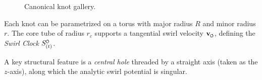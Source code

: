 \documentclass[reprint,aps,onecolumn,nofootinbib]{revtex4-2}
\newcommand{\swirlarrow}{%
    \mathchoice{\mkern-2mu\scriptstyle\boldsymbol{\circlearrowleft}}%
    {\mkern-2mu\scriptstyle\boldsymbol{\circlearrowleft}}%
    {\mkern-2mu\scriptscriptstyle\boldsymbol{\circlearrowleft}}%
    {\mkern-2mu\scriptscriptstyle\boldsymbol{\circlearrowleft}}%
}
\newcommand{\vswirl}{\mathbf{v}_{\swirlarrow}}
\newcommand{\SwirlClock}{S_{(t)}^{\swirlarrow}}
\begin{document}
    \begin{figure}[htbp]
        \centering
        \hfill
        \hfill
        \hfill
        \caption{Canonical knot gallery.}
        \label{fig:knot-gallery}
    \end{figure}

    Each knot can be parametrized on a torus with major radius $R$ and minor radius $r$.
    The core tube of radius $r_c$ supports a tangential swirl velocity $\vswirl$, defining the \emph{Swirl Clock} $\SwirlClock$.

    A key structural feature is a \emph{central hole} threaded by a straight axis (taken as the $z$-axis), along which the analytic swirl potential is singular.
\end{document}
